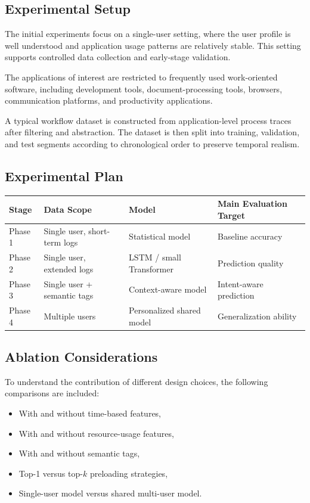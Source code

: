 \documentclass[11pt]{article}
\begin{document}
\subsection{Experimental Setup}

The initial experiments focus on a single-user setting, where the user profile is well understood and application usage patterns are relatively stable. This setting supports controlled data collection and early-stage validation.

The applications of interest are restricted to frequently used work-oriented software, including development tools, document-processing tools, browsers, communication platforms, and productivity applications.

A typical workflow dataset is constructed from application-level process traces after filtering and abstraction. The dataset is then split into training, validation, and test segments according to chronological order to preserve temporal realism.

\subsection{Experimental Plan}

\begin{center}
\begin{tabular}{llll}
\hline
Stage & Data Scope & Model & Main Evaluation Target \\
\hline
Phase 1 & Single user, short-term logs & Statistical model & Baseline accuracy \\
Phase 2 & Single user, extended logs & LSTM / small Transformer & Prediction quality \\
Phase 3 & Single user + semantic tags & Context-aware model & Intent-aware prediction \\
Phase 4 & Multiple users & Personalized shared model & Generalization ability \\
\hline
\end{tabular}
\end{center}

\subsection{Ablation Considerations}

To understand the contribution of different design choices, the following comparisons are included:

\begin{itemize}
\item With and without time-based features,
\item With and without resource-usage features,
\item With and without semantic tags,
\item Top-1 versus top-$k$ preloading strategies,
\item Single-user model versus shared multi-user model.
\end{itemize}
\end{document}
